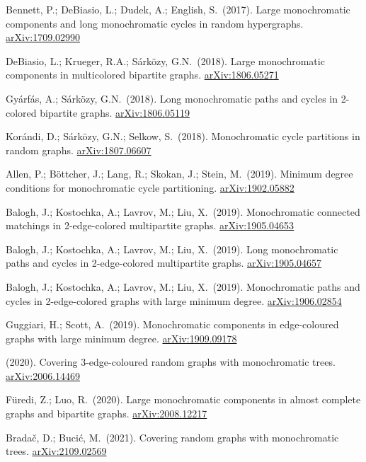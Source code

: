 \documentclass[12pt,a4paper,twoside,openright]{book}
\theoremstyle{definition}
\newcommand{\arxiv}[1]{\href{https://arxiv.org/abs/#1}{\textcolor{linkcolor}{arXiv:#1}}}
\begin{document}
\begin{enumerate}[label={[\arabic*]}, leftmargin=2cm]
\item Bennett, P.; DeBiasio, L.; Dudek, A.; English, S.\ (2017). Large monochromatic components and long monochromatic cycles in random hypergraphs. \arxiv{1709.02990}

\item DeBiasio, L.; Krueger, R.A.; Sárközy, G.N.\ (2018). Large monochromatic components in multicolored bipartite graphs. \arxiv{1806.05271}

\item Gyárfás, A.; Sárközy, G.N.\ (2018). Long monochromatic paths and cycles in 2-colored bipartite graphs. \arxiv{1806.05119}

\item Korándi, D.; Sárközy, G.N.; Selkow, S.\ (2018). Monochromatic cycle partitions in random graphs. \arxiv{1807.06607}

\item Allen, P.; Böttcher, J.; Lang, R.; Skokan, J.; Stein, M.\ (2019). Minimum degree conditions for monochromatic cycle partitioning. \arxiv{1902.05882}

\item Balogh, J.; Kostochka, A.; Lavrov, M.; Liu, X.\ (2019). Monochromatic connected matchings in 2-edge-colored multipartite graphs. \arxiv{1905.04653}

\item Balogh, J.; Kostochka, A.; Lavrov, M.; Liu, X.\ (2019). Long monochromatic paths and cycles in 2-edge-colored multipartite graphs. \arxiv{1905.04657}

\item Balogh, J.; Kostochka, A.; Lavrov, M.; Liu, X.\ (2019). Monochromatic paths and cycles in 2-edge-colored graphs with large minimum degree. \arxiv{1906.02854}

\item Guggiari, H.; Scott, A.\ (2019). Monochromatic components in edge-coloured graphs with large minimum degree. \arxiv{1909.09178}

\item (2020). Covering 3-edge-coloured random graphs with monochromatic trees. \arxiv{2006.14469}

\item Füredi, Z.; Luo, R.\ (2020). Large monochromatic components in almost complete graphs and bipartite graphs. \arxiv{2008.12217}

\item Bradač, D.; Bucić, M.\ (2021). Covering random graphs with monochromatic trees. \arxiv{2109.02569}


\end{enumerate}
\end{document}
